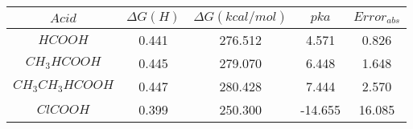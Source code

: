 \begin{tabular}{|c|c|c|c|c|}
    \hline
    $Acid$          & $\Delta G (H)$ & $\Delta G (kcal/mol)$ & $pka$   & $Error_{abs}$ \\ \hline
    $HCOOH$         & 0.441          & 276.512               & 4.571   & 0.826       \\ \hline
    $CH_3HCOOH$     & 0.445          & 279.070               & 6.448   & 1.648       \\ \hline
    $CH_3CH_3HCOOH$ & 0.447          & 280.428               & 7.444   & 2.570       \\ \hline
    $ClCOOH$        & 0.399          & 250.300               & -14.655 & 16.085      \\ \hline
\end{tabular}
